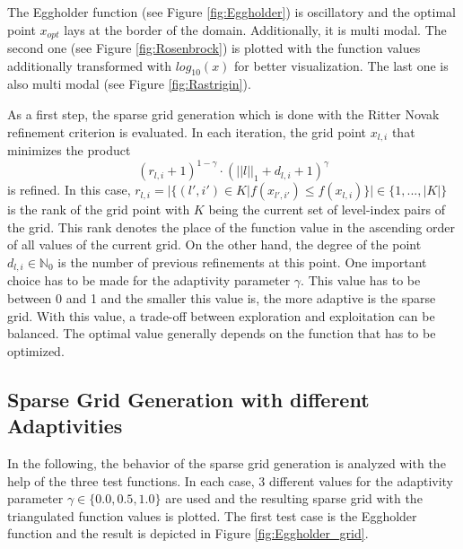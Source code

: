 The Eggholder function (see Figure \ref{fig:Eggholder}) is oscillatory and the optimal point $ x_{opt} $ lays at the border of the domain. Additionally, it is multi modal. The second one (see Figure \ref{fig:Rosenbrock}) is plotted with the function values additionally transformed with $ log_{10}(x) $ for better visualization. The last one is also multi modal (see Figure \ref{fig:Rastrigin}). 

As a first step, the sparse grid generation which is done with the Ritter Novak refinement criterion \cite{b_splines} is evaluated. In each iteration, the grid point $ x_{l,i} $ that minimizes the product 
\begin{equation}
	(r_{l,i} +1)^{1 - \gamma} \cdot (||l||_1 + d_{l,i} + 1)^{\gamma}
\end{equation}
is refined. In this case, $ r_{l,i} = |\{ (l', i') \in K | f(x_{l',i'}) \le f(x_{l,i}) \}| \in \{1, ... , |K|\} $ is the rank of the grid point with $ K $ being the current set of level-index pairs of the grid. This rank denotes the place of the function value in the ascending order of all values of the current grid. On the other hand, the degree of the point $ d_{l,i} \in \mathbb{N}_0 $ is the number of previous refinements at this point. One important choice has to be made for the adaptivity parameter $ \gamma $. This value has to be between 0 and 1 and the smaller this value is, the more adaptive is the sparse grid. With this value, a trade-off between exploration and exploitation can be balanced. The optimal value generally depends on the function that has to be optimized. \newline

\subsection{Sparse Grid Generation with different Adaptivities}

In the following, the behavior of the sparse grid generation is analyzed with the help of the three test functions. In each case, 3 different values for the adaptivity parameter $ \gamma \in \{0.0, 0.5, 1.0\} $ are used and the resulting sparse grid with the triangulated function values is plotted. The first test case is the Eggholder function and the result is depicted in Figure \ref{fig:Eggholder_grid}.

